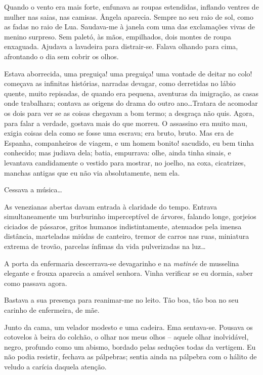 Quando o vento era mais forte, enfunava as roupas estendidas, inflando
ventres de mulher nas saias, nas camisas. Ângela aparecia. Sempre no
seu raio de sol, como as fadas no raio de Lua. Saudava{}-me à janela
com uma das exclamações vivas de menino surpreso. Sem paletó, às mãos,
empilhados, dois montes de roupa enxaguada. Ajudava a lavadeira para
distrair{}-se. Falava olhando para cima, afrontando o dia sem cobrir os
olhos. 

Estava aborrecida, uma preguiça! uma preguiça! uma vontade de
deitar no colo! começava as infinitas histórias, narradas devagar, como
derretidas no lábio quente, muito repisadas, de quando era pequena,
aventuras da imigração, as casas onde trabalhara; contava as origens do
drama do outro ano\ldots Tratara de acomodar os dois para ver se as coisas
chegavam a bom termo; a desgraça não quis. Agora, para falar a verdade,
gostava mais do que morreu. O assassino era muito mau, exigia coisas
dela como se fosse uma escrava; era bruto, bruto. Mas era de Espanha,
companheiros de viagem, e um homem bonito! sacudido, eu bem tinha
conhecido; mas judiava dela; batia, empurrava: olhe, ainda tinha
sinais, e levantava candidamente o vestido para mostrar, no joelho, na
coxa, cicatrizes, manchas antigas que eu não via absolutamente, nem
ela. 

Cessava a música\ldots 


As venezianas abertas davam entrada à
claridade do tempo. Entrava simultaneamente um burburinho imperceptível
de árvores, falando longe, gorjeios ciciados de pássaros, gritos
humanos indistintamente, atenuados pela imensa distância, marteladas
miúdas de canteiro, tremor de carros nas ruas, miniatura extrema de
trovão, parcelas ínfimas da vida pulverizadas na luz\ldots 

A porta da
enfermaria descerrava{}-se devagarinho e na \textit{matinée} de musselina
elegante e frouxa aparecia a amável senhora. Vinha verificar se eu
dormia, saber como passava agora. 

Bastava a sua presença para
reanimar{}-me no leito. Tão boa, tão boa no seu carinho de enfermeira,
de mãe. 

Junto da cama, um velador modesto e uma cadeira. Ema
sentava{}-se. Pousava os cotovelos à beira do colchão, o olhar nos meus
olhos -- aquele olhar inolvidável, negro, profundo como um abismo,
bordado pelas seduções todas da vertigem. Eu não podia resistir,
fechava as pálpebras; sentia ainda na pálpebra com o hálito de veludo a
carícia daquela atenção.

